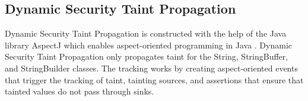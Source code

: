 \subsection{Dynamic Security Taint Propagation}
Dynamic Security Taint Propagation \parencite{securityTaint} is constructed with the help of the Java library AspectJ which enables aspect-oriented programming in Java \parencite{aspectj}. Dynamic Security Taint Propagation only propagates taint for the String, StringBuffer, and StringBuilder classes. The tracking works by creating aspect-oriented events that trigger the tracking of taint, tainting sources, and assertions that ensure that tainted values do not pass through sinks.